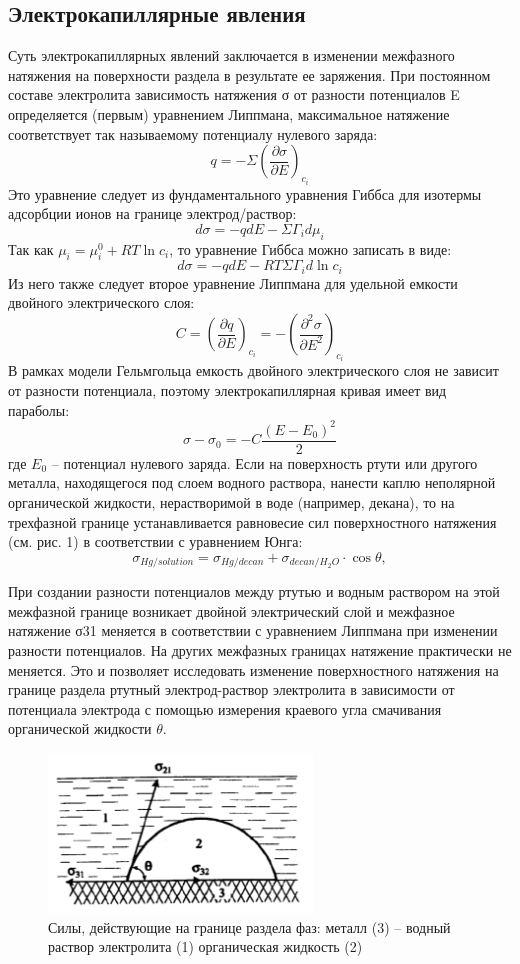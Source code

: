 \documentclass[a4paper,12pt]{article}
\begin{document}
\subsection{Электрокапиллярные явления}
Суть электрокапиллярных явлений заключается в изменении межфазного натяжения на поверхности раздела в результате ее заряжения. При постоянном составе
электролита зависимость натяжения σ от разности потенциалов E определяется
(первым) уравнением Липпмана, максимальное натяжение соответствует так называемому потенциалу нулевого заряда:
\[
		q = -\Sigma(\frac{\partial\sigma}{\partial{E}})_{c_{i}}
	\]
Это уравнение следует из фундаментального уравнения Гиббса для изотермы
адсорбции ионов на границе электрод/раствор:
\[
		d\sigma = -qdE - \Sigma\Gamma_{i}d\mu_{i}
	\]
Так как $\mu_{i} = \mu^{0}_{i}+RT\ln c_{i}$, то уравнение Гиббса можно записать в виде:
\[
d\sigma = -qdE - RT\Sigma\Gamma_{i}d\ln c_{i}
\]
Из него также следует второе уравнение Липпмана для удельной емкости двойного электрического слоя:
\[
C = (\frac{\partial q}{\partial E})_{c_{i}} = -(\frac{\partial^{2}\sigma}{\partial E^{2}})_{c_{i}}
\]
В рамках модели Гельмгольца емкость двойного электрического слоя не зависит
от разности потенциала, поэтому электрокапиллярная кривая имеет вид параболы:
\[
\sigma - \sigma_{0} = -C\frac{(E-E_{0})^{2}}{2}
\]
где $E_{0}$ – потенциал нулевого заряда.
Если на поверхность ртути или другого металла, находящегося под слоем водного раствора, нанести каплю неполярной органической жидкости, нерастворимой
в воде (например, декана), то на трехфазной границе устанавливается равновесие
сил поверхностного натяжения (см. рис. 1) в соответствии с уравнением Юнга:
\begin{equation}
\sigma_{Hg/solution} = \sigma_{Hg/decan} +\sigma_{decan/H_{2}O}\cdot\cos\theta,
\end{equation}

При создании разности потенциалов между ртутью и водным раствором на этой межфазной границе возникает двойной электрический слой и межфазное натяжение σ31 меняется в соответствии с уравнением Липпмана при изменении разности
потенциалов. На других межфазных границах натяжение практически не меняется. Это и позволяет исследовать изменение поверхностного натяжения на границе
раздела ртутный электрод-раствор электролита в зависимости от потенциала электрода с помощью измерения краевого угла смачивания органической жидкости $\theta$.

\begin{figure}[h!]
    \centering
    \includegraphics[width=7cm]{1.png}
    \caption{Силы, действующие на границе раздела фаз: металл (3) – водный раствор электролита (1) органическая жидкость (2)}
    \label{fig:vac}
\end{figure}
\end{document}

